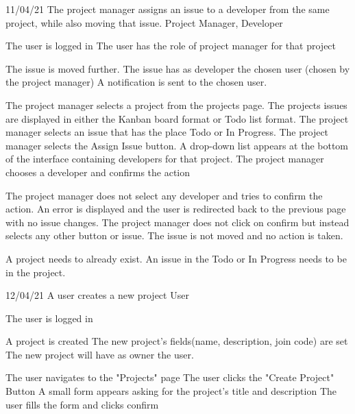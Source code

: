\documentclass[10pt,a4paper]{article}
\begin{document}
{11/04/21}
{The project manager assigns an issue to a developer from the same project, while also moving that issue.}
{Project Manager, Developer}
{\begin{itemize}
	\q The user is logged in
	\q The user has the role of project manager for that project
	\end{itemize}}
{\begin{itemize}
	\q The issue is moved further.
	\q The issue has as developer the chosen user (chosen by the project manager)
	\q A notification is sent to the chosen user.
	\end{itemize}}
{\begin{itemize}
	\q The project manager selects a project from the projects page.
	\q The projects issues are displayed in either the Kanban board format or Todo list format.
	\q The project manager selects an issue that has the place Todo or In Progress.
	\q The project manager selects the Assign Issue button.
	\q A drop-down list appears at the bottom of the interface containing developers for that project.
	\q The project manager chooses a developer and confirms the action 
	\end{itemize}}
{\begin{itemize}
	\q The project manager does not select any developer and tries to confirm the action. An error is displayed and the user is redirected back to the previous page with no issue changes.
	\q The project manager does not click on confirm but instead selects any other button or issue. The issue is not moved and no action is taken.
	\end{itemize}}
{\begin{itemize}
	\q A project needs to already exist.
	\q An issue in the Todo or In Progress needs to be in the project.
	\end{itemize}}
{12/04/21}
{A user creates a new project}
{User}
{\begin{itemize}
	\q The user is logged in
\end{itemize}}
{\begin{itemize}
	\q A project is created
	\q The new project's fields(name, description, join code) are set
	\q The new project will have as owner the user.
\end{itemize}}
{\begin{itemize}
	\q The user navigates to the "Projects" page
	\q The user clicks the "Create Project" Button
	\q A small form appears asking for the project's title and description
	\q The user fills the form and clicks confirm
\end{itemize}}
\end{document}

